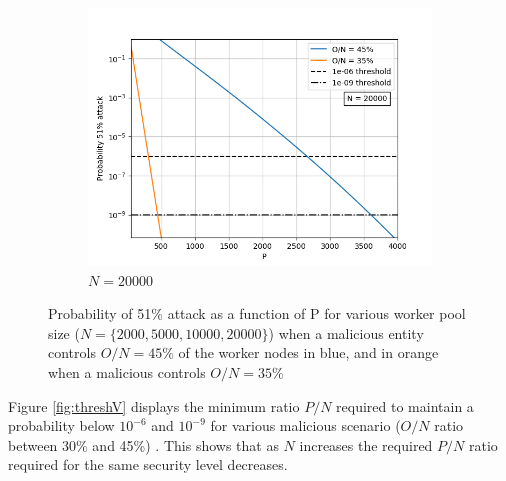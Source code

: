 \begin{figure}[H]
        \begin{subfigure}[b]{0.45\textwidth}
        \includegraphics[width=\textwidth]{Figures/Prob51_vs_P_N20000_O35_to_45}
   
        \renewcommand{\thesubfigure}{d}
        \caption{$N = 20000$}
        \label{fig:N=20000}
    \end{subfigure}
\caption{Probability of 51\% attack as a function of P for various worker pool size ($N=\{2000, 5000, 10000, 20000\}$) when a malicious entity controls $O/N = 45\%$ of the worker nodes in blue, and in orange when a malicious controls $O/N = 35\%$}\label{fig:P}
\end{figure}    

Figure \ref{fig:threshV} displays the minimum ratio $P/N$ required to maintain a probability below $10^{-6}$ and $10^{-9}$ for various malicious scenario ($O/N$ ratio between 30\% and 45\%) . This shows that as $N$ increases the required $P/N$ ratio required for the same security level decreases. 


